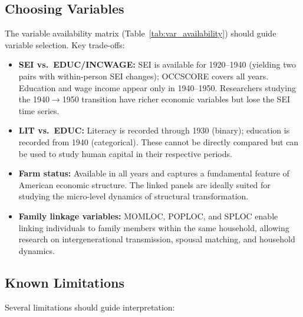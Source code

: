 \documentclass[12pt]{article}
\begin{document}
\subsection{Choosing Variables}

The variable availability matrix (Table~\ref{tab:var_availability}) should guide variable selection. Key trade-offs:

\begin{itemize}
\item \textbf{SEI vs.\ EDUC/INCWAGE:} SEI is available for 1920--1940 (yielding two pairs with within-person SEI changes); OCCSCORE covers all years. Education and wage income appear only in 1940--1950. Researchers studying the 1940$\rightarrow$1950 transition have richer economic variables but lose the SEI time series.

\item \textbf{LIT vs.\ EDUC:} Literacy is recorded through 1930 (binary); education is recorded from 1940 (categorical). These cannot be directly compared but can be used to study human capital in their respective periods.

\item \textbf{Farm status:} Available in all years and captures a fundamental feature of American economic structure. The linked panels are ideally suited for studying the micro-level dynamics of structural transformation.

\item \textbf{Family linkage variables:} MOMLOC, POPLOC, and SPLOC enable linking individuals to family members within the same household, allowing research on intergenerational transmission, spousal matching, and household dynamics.
\end{itemize}

\subsection{Known Limitations}

Several limitations should guide interpretation:
\end{document}
